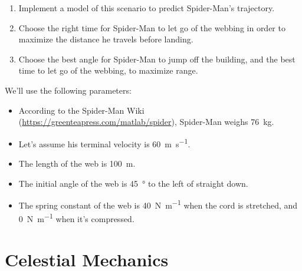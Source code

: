 \begin{enumerate}

\item
  Implement a model of this scenario to predict Spider-Man's trajectory.


\item
  Choose the right time for Spider-Man to let go of the webbing in order to maximize the distance he travels before landing.


\item
  Choose the best angle for Spider-Man to jump off the building, and the best time to let go of the webbing, to maximize range.

  
\end{enumerate}

We'll use the following parameters:


\begin{itemize}

\item According to the Spider-Man Wiki (\url{https://greenteapress.com/matlab/spider}), Spider-Man weighs \SI{76}{\kg}.

\item
  Let's assume his terminal velocity is \SI{60}{\meter\per\second}.


\item
  The length of the web is \SI{100}{\meter}.

\item
  The initial angle of the web is \SI{45}{\degree} to the left of straight
  down.

\item
  The spring constant of the web is \SI{40}{\newton\per\meter} when the cord is stretched, and \SI{0}{\newton\per\meter} when it's compressed.
  

\end{itemize}


\section{Celestial Mechanics}


